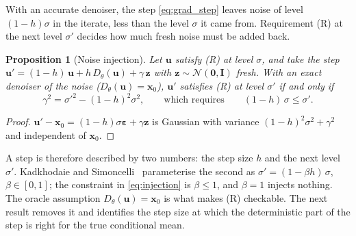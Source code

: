 \documentclass[11pt]{article}
\newtheorem{proposition}{Proposition}
\theoremstyle{definition}
\theoremstyle{remark}
\newcommand{\x}{\bm{x}}
\newcommand{\uu}{\bm{u}}
\newcommand{\eps}{\bm{\varepsilon}}
\newcommand{\zz}{\bm{z}}
\newcommand{\N}{\mathcal{N}}
\newcommand{\Id}{\bm{I}}
\newcommand{\D}{D_\theta}
\begin{document}
\noindent With an accurate denoiser, the step \eqref{eq:grad_step} leaves noise of level
$(1-h)\sigma$ in the iterate, less than the level $\sigma$ it came from. Requirement (R) at the
next level $\sigma'$ decides how much fresh noise must be added back.

\begin{proposition}[Noise injection]\label{prop:injection}
Let $\uu$ satisfy (R) at level $\sigma$, and take the step
$\uu' = (1-h)\,\uu + h\,\D(\uu) + \gamma\,\zz$ with $\zz\sim\N(\bm0,\Id)$ fresh. With an exact
denoiser of the noise ($\D(\uu)=\x_0$), $\uu'$ satisfies (R) at level $\sigma'$ if and only if
\begin{equation}
  \gamma^2 = \sigma'^2 - (1-h)^2\sigma^2, \qquad\text{which requires}\qquad
  (1-h)\,\sigma \le \sigma' .
  \label{eq:injection}
\end{equation}
\end{proposition}
\begin{proof}
$\uu' - \x_0 = (1-h)\sigma\eps + \gamma\zz$ is Gaussian with variance $(1-h)^2\sigma^2+\gamma^2$
and independent of $\x_0$.
\end{proof}

A step is therefore described by two numbers: the step size $h$ and the next level $\sigma'$.
Kadkhodaie and Simoncelli~\cite{ks2021} parameterise the second as
$\sigma' = (1-\beta h)\,\sigma$, $\beta\in[0,1]$; the constraint in \eqref{eq:injection} is
$\beta\le1$, and $\beta=1$ injects nothing. The oracle assumption $\D(\uu)=\x_0$ is what makes
(R) checkable. The next result removes it and identifies the step size at which the
deterministic part of the step is right for the true conditional mean.
\end{document}
